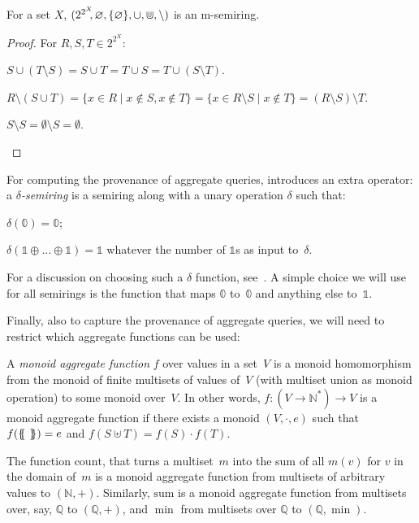 \begin{propositionrep}
\laxmain{%
}%
\laxapp{%
}%
	For a set $X$,
	$(2^{2^X}\!\!,\varnothing,\{\varnothing\},\cup,\doublecup,\setminus)$ is an
	m-semiring.
\laxapp{%
}%
\laxmain{%
}%
\end{propositionrep}

\begin{proof}
	For $R, S, T\in 2^{2^X}$:

	\begin{compactenum}[(i)]
		\item
		$S \cup (T \setminus S) =S \cup T = T \cup S = T \cup (S \setminus T).$
		\item
		$R \setminus (S \cup T) = \{x\in R \mid x \notin S, x \notin T\}=
			\{x\in R\setminus S\mid x \notin T\}=(R \setminus S) \setminus T. $
		\item $S\setminus S=\emptyset \setminus S=\emptyset$. \qedhere
	\end{compactenum}
\end{proof}

For computing the provenance of aggregate queries,
\cite{amsterdamer2011provenance} introduces an extra operator:
a \emph{$\delta$-semiring} is a semiring along with a unary operation
$\delta$ such that:
\begin{inparaenum}[(i)]
	\item \(\delta(\mathbb{0})=\mathbb{0}\);
	\item
	\(\delta(\mathbb{1}\oplus\dots\oplus\mathbb{1})=\mathbb{1}\) whatever
	the number of $\mathbb{1}$s as input to~$\delta$.
\end{inparaenum}
For a discussion on choosing such a $\delta$ function,
see~\cite{amsterdamer2011provenance}. A simple
choice we will use for all semirings is the function that maps
$\mathbb 0$ to~$\mathbb{0}$ and anything else to~$\mathbb{1}$.

Finally, also to capture the provenance of aggregate queries, we will
need to restrict which aggregate functions can be used:
\begin{definition}
	A \emph{monoid aggregate function} $f$ over values in a set~$V$ is a
	monoid homomorphism from the monoid of finite multisets of values of~$V$
	(with multiset union as monoid operation) to some monoid over~$V$.
	In other words, $f:(V\to \mathbb{N}^*)\to V$ is a monoid aggregate function if there exists a
	monoid $(V,\cdot,e)$ such that $f(\left\{\!\!\left\{\,\,\right\}\!\!\right\})=e$ and
	$f(S\uplus T)=f(S)\cdot f(T)$.
\end{definition}

\begin{example}
	The function $\mathrm{count}$, that turns a multiset~$m$ into the sum of
	all $m(v)$ for $v$ in the domain of~$m$ is a monoid aggregate function
	from multisets of arbitrary values to $(\mathbb{N},+)$. Similarly,
	$\mathrm{sum}$ is a monoid aggregate function from multisets over, say,
	$\mathbb{Q}$ to $(\mathbb{Q},+)$, and $\min$ from multisets over
	$\mathbb{Q}$ to $(\mathbb Q,\min)$.
\end{example}
